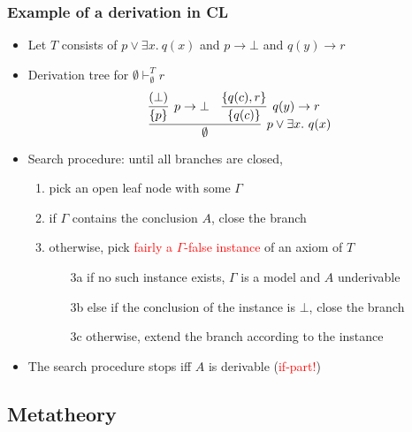 \documentclass[handout,11pt]{beamer}
\newcommand{\red}[1]{\textcolor{red}{#1}}
\newcommand{\set}[1]{\{#1\}}
\begin{document}
\begin{frame}
\frametitle{Example of a derivation in CL}
 \begin{itemize}[<+->]   %
    \item Let $T$ consists of $p\lor \exists x.~q(x)$ 
    and $p\to\bot$ and $q(y)\to r$
    \item Derivation tree for $\emptyset\vdash_{\emptyset}^T r$
    \[
\infer[p\vee \exists x.~q(x)]{\emptyset}
{
\infer[p\to\bot]{\set{p}}{(\bot)} & \infer[q(y)\to r]{\set{q(c)}}{\set{q(c),r}}
}
\]
    \item Search procedure: until all branches are closed,
    \begin{enumerate}
    \item pick an open leaf node with some $\Gamma$
    \item if $\Gamma$ contains the conclusion $A$, close the branch
    \item otherwise, pick \red{fairly a $\Gamma$-false 
    instance} of an axiom of $T$    
    \begin{itemize}
    \item[3a] if no such instance exists, $\Gamma$ is a model and $A$ underivable
    \item[3b] else if the conclusion of the instance is $\bot$, close the branch
    \item[3c] otherwise, extend the branch according to the instance 
    \end{itemize}
    \end{enumerate}
    \item The search procedure stops iff $A$ is derivable (\red{if-part!})
 \end{itemize}
\end{frame}

\subsection{Metatheory}
\end{document}
